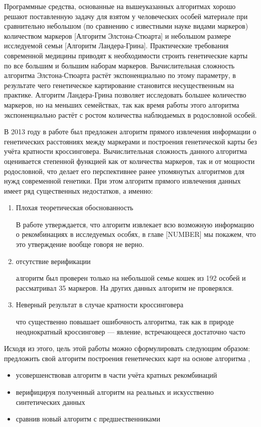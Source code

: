 \documentclass{matmex-diploma-custom}
\begin{document}
Программные средства, основанные на вышеуказанных алгоритмах хорошо
решают поставленную задачу для взятом у человеческих особей материале
при сравнительно небольшом (по сравнению с известными науке видами
маркеров) количеством маркеров [Алгоритм Элстона-Стюарта] и небольшом
размере исследуемой семьи [Алгоритм Ландера-Грина]. Практические
требования современной медицины приводят к необходимости строить
генетические карты по все большим и большим наборам
маркеров. Вычислительная сложность алгоритма Элстона-Стюарта растёт
экспоненциально по этому параметру, в результате чего генетическое
картирование становится несущественным на практике. Алгоритм
Ландера-Грина позволяет исследовать большее количество маркеров, но на
меньших семействах, так как время работы этого алгоритма
экспоненциально растёт с ростом количества наблюдаемых в родословной
особей.

В 2013 году в работе \cite{sysoev} был предложен алгоритм прямого
извлечения информации о генетических расстояниях между маркерами и
построения генетической карты без учёта кратности
кроссинговера. Вычислительная сложность данного алгоритма оценивается
степенной функцией как от количества маркеров, так и от мощности
родословной, что делает его перспективнее ранее упомянутых
алгоритмов для нужд современной генетики. При этом алгоритм прямого
извлечения данных имеет ряд существенных недостатков, а именно:
\begin{enumerate}
\item Плохая теоретическая обоснованность

В работе \cite{sysoev} утверждается, что алгоритм извлекает всю
возможную информацию о рекомбинациях в исследуемых особях, в главе
[NUMBER] мы покажем, что это утверждение вообще говоря не верно.

\item отсутствие верификации

алгоритм был проверен только на небольшой семье кошек из 192 особей и
рассматривал 35 маркеров. На других данных алгоритм не проверялся.

\item Неверный результат в случае кратности кроссинговера

что существенно повышает ошибочность алгоритма, так как в природе
неоднократный кроссинговер --- явление, встречающееся достаточно часто

\end{enumerate}

Исходя из этого, цель этой работы можно сформулировать следующим
образом: предложить свой алгоритм построения генетических карт на
основе алгоритма \cite{sysoev},
\begin{itemize}
\item усовершенствовав алгоритм в части учёта кратных рекомбинаций
\item верифицируя полученный алгоритм на реальных и искусственно
  синтетических данных
\item сравнив новый алгоритм с предшественниками
\end{itemize}
\end{document}
